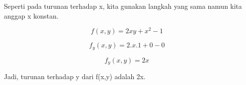 \documentclass[a4paper,10pt]{article}
\begin{document}
\begin{eulernotebook}
\begin{eulercomment}
\begin{eulercomment}
\begin{eulercomment}
\begin{eulercomment}
\begin{eulercomment}
\begin{eulercomment}
\begin{eulercomment}
\begin{eulercomment}
\begin{eulercomment}
\begin{eulercomment}
\begin{eulercomment}
\begin{eulercomment}
\begin{eulercomment}
\begin{eulercomment}
\begin{eulercomment}
\begin{eulercomment}
\begin{eulercomment}
\begin{eulercomment}
\begin{eulercomment}
\begin{eulercomment}
\begin{eulercomment}
\begin{eulercomment}
\begin{eulercomment}
\begin{eulercomment}
\begin{eulercomment}
\begin{eulercomment}
\begin{eulercomment}
\begin{eulercomment}
\begin{eulercomment}
\begin{eulercomment}
\begin{euleroutput}
\end{euleroutput}
\begin{eulercomment}
Seperti pada turunan terhadap x, kita gunakan langkah yang sama namun
kita anggap x konstan.

\end{eulercomment}
\begin{eulerformula}
\[
f(x,y)=2xy+x^2-1
\]
\end{eulerformula}
\begin{eulerformula}
\[
f_y(x,y)=2.x.1+0-0
\]
\end{eulerformula}
\begin{eulerformula}
\[
f_y(x,y)=2x
\]
\end{eulerformula}
\begin{eulercomment}
Jadi, turunan terhadap y dari f(x,y) adalah 2x.



\end{eulercomment}
\end{eulercomment}
\end{eulercomment}
\end{eulercomment}
\end{eulercomment}
\end{eulercomment}
\end{eulercomment}
\end{eulercomment}
\end{eulercomment}
\end{eulercomment}
\end{eulercomment}
\end{eulercomment}
\end{eulercomment}
\end{eulercomment}
\end{eulercomment}
\end{eulercomment}
\end{eulercomment}
\end{eulercomment}
\end{eulercomment}
\end{eulercomment}
\end{eulercomment}
\end{eulercomment}
\end{eulercomment}
\end{eulercomment}
\end{eulercomment}
\end{eulercomment}
\end{eulercomment}
\end{eulercomment}
\end{eulercomment}
\end{eulercomment}
\end{eulercomment}
\end{eulernotebook}
\end{document}
